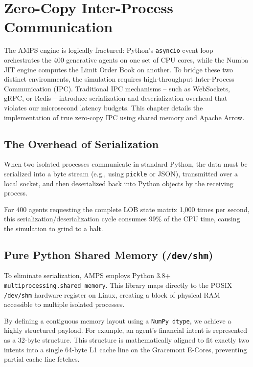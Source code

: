 \chapter{Zero-Copy Inter-Process Communication}
\label{ch:zero_copy_ipc}

The AMPS engine is logically fractured: Python's \texttt{asyncio} event loop orchestrates the 400 generative agents on one set of CPU cores, while the Numba JIT engine computes the Limit Order Book on another. To bridge these two distinct environments, the simulation requires high-throughput Inter-Process Communication (IPC). Traditional IPC mechanisms -- such as WebSockets, gRPC, or Redis -- introduce serialization and deserialization overhead that violates our microsecond latency budgets. This chapter details the implementation of true zero-copy IPC using shared memory and Apache Arrow.

\section{The Overhead of Serialization}

When two isolated processes communicate in standard Python, the data must be serialized into a byte stream (e.g., using \texttt{pickle} or JSON), transmitted over a local socket, and then deserialized back into Python objects by the receiving process. 

For 400 agents requesting the complete LOB state matrix 1,000 times per second, this serialization/deserialization cycle consumes 99\% of the CPU time, causing the simulation to grind to a halt.

\section{Pure Python Shared Memory (\texttt{/dev/shm})}

To eliminate serialization, AMPS employs Python 3.8+ \texttt{multiprocessing.shared\_memory}. This library maps directly to the POSIX \texttt{/dev/shm} hardware register on Linux, creating a block of physical RAM accessible to multiple isolated processes.

By defining a contiguous memory layout using a \texttt{NumPy dtype}, we achieve a highly structured payload. For example, an agent's financial intent is represented as a 32-byte structure. This structure is mathematically aligned to fit exactly two intents into a single 64-byte L1 cache line on the Gracemont E-Cores, preventing partial cache line fetches.


